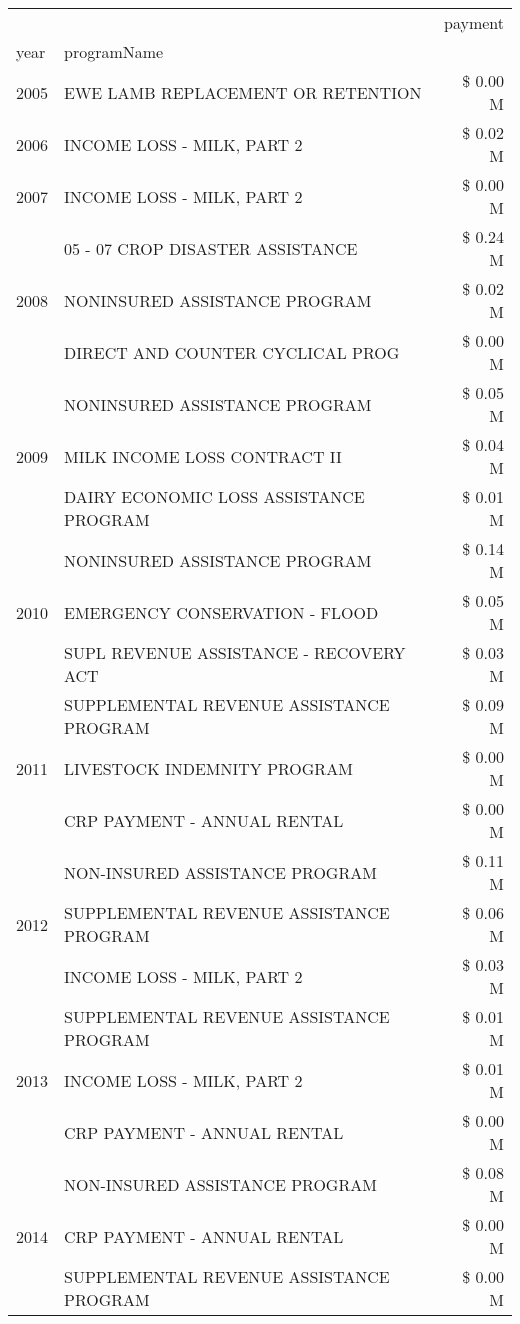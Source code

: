 \begin{tabular}{llr}
\toprule
 &  & payment \\
year & programName &  \\
\midrule
2005 & EWE LAMB REPLACEMENT OR RETENTION & \$ 0.00 M \\
\cline{1-3}
2006 & INCOME LOSS - MILK, PART 2 & \$ 0.02 M \\
\cline{1-3}
2007 & INCOME LOSS - MILK, PART 2 & \$ 0.00 M \\
\cline{1-3}
\multirow[t]{3}{*}{2008} & 05 - 07 CROP DISASTER ASSISTANCE & \$ 0.24 M \\
 & NONINSURED ASSISTANCE PROGRAM & \$ 0.02 M \\
 & DIRECT AND COUNTER CYCLICAL PROG & \$ 0.00 M \\
\cline{1-3}
\multirow[t]{3}{*}{2009} & NONINSURED ASSISTANCE PROGRAM & \$ 0.05 M \\
 & MILK INCOME LOSS CONTRACT II & \$ 0.04 M \\
 & DAIRY ECONOMIC LOSS ASSISTANCE PROGRAM & \$ 0.01 M \\
\cline{1-3}
\multirow[t]{3}{*}{2010} & NONINSURED ASSISTANCE PROGRAM & \$ 0.14 M \\
 & EMERGENCY CONSERVATION - FLOOD & \$ 0.05 M \\
 & SUPL REVENUE ASSISTANCE - RECOVERY ACT & \$ 0.03 M \\
\cline{1-3}
\multirow[t]{3}{*}{2011} & SUPPLEMENTAL REVENUE ASSISTANCE PROGRAM & \$ 0.09 M \\
 & LIVESTOCK INDEMNITY PROGRAM & \$ 0.00 M \\
 & CRP PAYMENT - ANNUAL RENTAL & \$ 0.00 M \\
\cline{1-3}
\multirow[t]{3}{*}{2012} & NON-INSURED ASSISTANCE PROGRAM & \$ 0.11 M \\
 & SUPPLEMENTAL REVENUE ASSISTANCE PROGRAM & \$ 0.06 M \\
 & INCOME LOSS - MILK, PART 2 & \$ 0.03 M \\
\cline{1-3}
\multirow[t]{3}{*}{2013} & SUPPLEMENTAL REVENUE ASSISTANCE PROGRAM & \$ 0.01 M \\
 & INCOME LOSS - MILK, PART 2 & \$ 0.01 M \\
 & CRP PAYMENT - ANNUAL RENTAL & \$ 0.00 M \\
\cline{1-3}
\multirow[t]{3}{*}{2014} & NON-INSURED ASSISTANCE PROGRAM & \$ 0.08 M \\
 & CRP PAYMENT - ANNUAL RENTAL & \$ 0.00 M \\
 & SUPPLEMENTAL REVENUE ASSISTANCE PROGRAM & \$ 0.00 M \\

\end{tabular}
